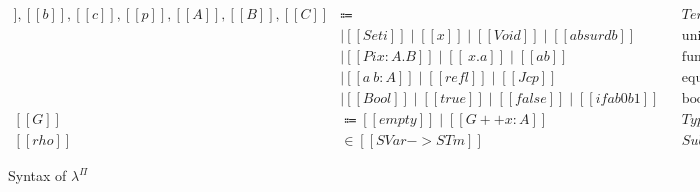 \documentclass[\ifpublic nolinenum\else\fi,online,OA]{jfp}
\newcommand{\scw}[1]{}
\newcommand{\lang}{$\lambda^{\Pi}$\xspace}
\theoremstyle{definition}
\begin{document}

\begin{figure}[h]
\begin{align*}
[[a]],[[b]],[[c]],[[p]],[[A]],[[B]],[[C]] & \Coloneqq && \textit{Terms} \\
            & \mid [[Set i]] \mid [[x]] \mid [[Void]] \mid [[absurd b]]
              && \textrm{universes, variables, empty type, explosion} \\
            & \mid [[Pi x : A . B]] \mid [[\ x . a]] \mid [[a b]]
              && \textrm{function types, abstractions, applications} \\
            & \mid [[a ~ b : A ]] \mid [[refl]] \mid [[J c p]]
              && \textrm{equality types, reflexivity proof, J eliminator} \\
            & \mid [[Bool]] \mid [[true]] \mid [[false]] \mid [[if a b0 b1]]
              && \textrm{boolean type, true, false, conditionals} \\
[[G]] & \Coloneqq [[empty]] \mid [[G ++ x : A]] && \textit{Typing contexts} \\
[[rho]] & \in [[SVar -> STm]] && \textit{Substitutions}
\end{align*}
\caption{Syntax of \lang}
\label{fig:syntax}
\end{figure}
\end{document}
